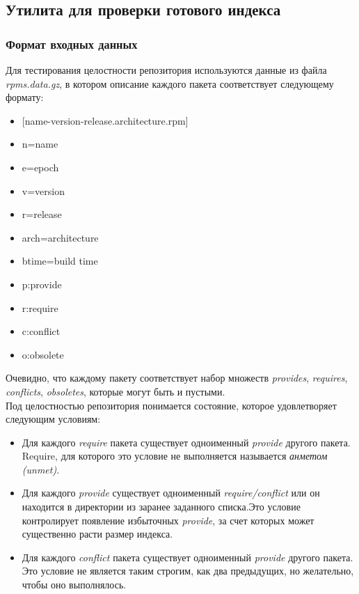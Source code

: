 \subsection{Утилита для проверки готового индекса}
\label{sn:index_test}
\subsubsection{Формат входных данных}
\label{sn:input_format}
Для тестирования целостности репозитория используются данные из файла \textit{rpms.data.gz},
в котором описание каждого пакета соответствует следующему формату:

\begin{itemize}
\item{[name-version-release.architecture.rpm] }
\item{n=name} 
\item{e=epoch}
\item{v=version}
\item{r=release}
\item{arch=architecture}
\item{btime=build time}
\item{p:provide}
\item{r:require}
\item{c:conflict}
\item{o:obsolete}
\end{itemize}
Очевидно, что каждому пакету соответствует набор множеств \textit{provides},
\textit{requires}, \textit{conflicts}, \textit{obsoletes}, которые могут быть и пустыми.\\

Под целостностью репозитория понимается состояние, которое удовлетворяет следующим
условиям:
\begin{itemize}
\item{Для каждого \textit{require} пакета существует одноименный \textit{provide} 
другого пакета. Require, для которого это условие не выполняется
называется \textit{анметом (unmet)}. }
\item{Для каждого \textit{provide} существует одноименный \textit{require/conflict} или
он находится в директории из заранее заданного списка.Это условие 
контролирует появление избыточных \textit{provide}, за счет которых 
может существенно расти размер индекса.}
\item{Для каждого \textit{conflict} пакета существует одноименный \textit{provide} 
другого пакета. Это условие не является таким строгим, как два предыдущих,
но желательно, чтобы оно выполнялось. }
\end{itemize}

